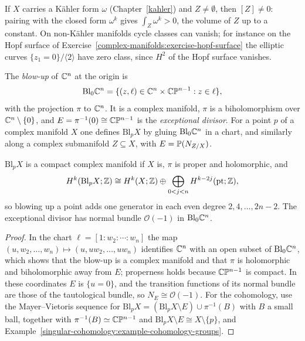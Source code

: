 \begin{remark}\label{complex-manifolds:remark-cycle-class-nonzero}
If $X$ carries a K\"ahler form $\omega$ (Chapter~\ref{kahler}) and $Z \neq \emptyset$, then $[Z] \neq 0$: pairing with the closed form $\omega^k$ gives $\int_Z\omega^k > 0$, the volume of $Z$ up to a constant.
On non-K\"ahler manifolds cycle classes can vanish; for instance on the Hopf surface of Exercise~\ref{complex-manifolds:exercise-hopf-surface} the elliptic curves $\{z_1 = 0\}/\langle 2 \rangle$ have
zero class, since $H^2$ of the Hopf surface vanishes.
\end{remark}

\begin{definition}\label{complex-manifolds:definition-blowup}
The \emph{blow-up} of $\mathbb{C}^n$ at the origin is
\[
\mathrm{Bl}_0\mathbb{C}^n = \{(z, \ell) \in \mathbb{C}^n \times \mathbb{C}\mathbb{P}^{n-1} : z \in \ell\},
\]
with the projection $\pi$ to $\mathbb{C}^n$. It is a complex manifold, $\pi$ is a biholomorphism over $\mathbb{C}^n \setminus \{0\}$, and $E = \pi^{-1}(0) \cong \mathbb{C}\mathbb{P}^{n-1}$ is the \emph{exceptional divisor}. For a point $p$ of
a complex manifold $X$ one defines $\mathrm{Bl}_pX$ by gluing $\mathrm{Bl}_0\mathbb{C}^n$ in a chart, and similarly along a complex submanifold $Z \subseteq X$, with $E = \mathbb{P}(N_{Z/X})$.
\end{definition}

\begin{proposition}\label{complex-manifolds:proposition-blowup}
$\mathrm{Bl}_pX$ is a compact complex manifold if $X$ is, $\pi$ is proper and holomorphic, and
\[
H^k(\mathrm{Bl}_pX; \mathbb{Z}) \cong H^k(X; \mathbb{Z}) \oplus \bigoplus_{0 < j < n} H^{k-2j}(\mathrm{pt}; \mathbb{Z}),
\]
so blowing up a point adds one generator in each even degree $2, 4, \ldots, 2n-2$. The exceptional divisor has normal bundle $\mathcal{O}(-1)$ in $\mathrm{Bl}_0\mathbb{C}^n$.
\end{proposition}

\begin{proof}
In the chart $\ell = [1 : w_2 : \cdots : w_n]$ the map $(u, w_2, \ldots, w_n) \mapsto (u, uw_2, \ldots, uw_n)$ identifies $\mathbb{C}^n$ with an open subset of $\mathrm{Bl}_0\mathbb{C}^n$, which shows that the blow-up is a complex
manifold and that $\pi$ is holomorphic and biholomorphic away from $E$; properness holds because $\mathbb{C}\mathbb{P}^{n-1}$ is compact. In these coordinates $E$ is $\{u = 0\}$, and the transition functions of its
normal bundle are those of the tautological bundle, so $N_{E} \cong \mathcal{O}(-1)$. For the cohomology, use the Mayer--Vietoris sequence for $\mathrm{Bl}_pX = (\mathrm{Bl}_pX \setminus E) \cup \pi^{-1}(B)$ with
$B$ a small ball, together with $\pi^{-1}(B) \simeq \mathbb{C}\mathbb{P}^{n-1}$ and $\mathrm{Bl}_pX \setminus E \cong X \setminus \{p\}$, and Example~\ref{singular-cohomology:example-cohomology-groups}.
\end{proof}

